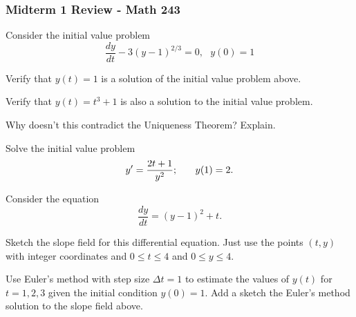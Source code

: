 \documentclass[11pt]{exam}
\begin{document}
\graphicspath{{/home/brian/Dropbox/HSC/Spring16/Math111/}}

\subsubsection*{Midterm 1 Review - Math 243}

\begin{questions}
\question Consider the initial value problem
$$\frac{dy}{dt}-3(y-1)^{2/3}=0,~~~ y(0)=1$$
\begin{parts}
\item Verify that $y(t) = 1$ is a solution of the initial value problem above.  
\vfill

\item Verify that $y(t) = t^3+1$ is also a solution to the initial value problem.   
\vfill

\item Why doesn't this contradict the Uniqueness Theorem?  Explain. 
\vfill
\end{parts}
\question Solve the initial value problem
$$y' = \frac{2t+1}{y^2}; \hspace{0.25in} y(1) = 2.$$ 
\vfill

\newpage
\question Consider the equation 
$$\frac{dy}{dt} = (y-1)^2+t.$$ 
\begin{parts}
\item Sketch the slope field for this differential equation.  Just use the points $(t,y)$ with integer coordinates and $0 \leq t \leq 4$ and $0 \leq y \leq 4$. 

\begin{center}
\end{center}

\item Use Euler's method with step size $\Delta t = 1$ to estimate the values of $y(t)$ for $t = 1, 2, 3$ given the initial condition $y(0) = 1$.  Add a sketch the Euler's method solution to the slope field above.  
\vfill
 



\end{parts}


\end{questions}
\end{document}
